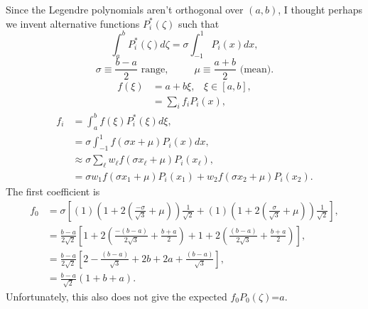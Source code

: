 \documentclass[11pt]{article} %
\begin{document}
Since the Legendre polynomials aren't orthogonal over $(a,b)$, I thought perhaps we invent alternative functions $P^*_i(\zeta)$ such that
\begin{equation}
\int_a^b P^*_i(\zeta) d\zeta = \sigma \int_{-1}^1 P_i(x)dx,
\end{equation}
\begin{equation}
\sigma \equiv \frac{b-a}{2} \text{ range}, \hspace{30pt} \mu\equiv \frac{a+b}{2} \text{ (mean)}.
\end{equation}
\begin{align}
f(\xi)&=a+b\xi,\hspace{10pt}\xi\in[a,b],\\
  &=\sum_i f_i P_i(x),
\end{align}
\begin{align}
f_i &= \int_a^b f(\xi)P_i^*(\xi) d\xi,\\
    &=\sigma\int_{-1}^1 f(\sigma x+\mu) P_i(x)dx,\\
    &\approx \sigma\sum_\ell w_\ell f(\sigma x_\ell+\mu)P_i(x_\ell),\\
    &=\sigma w_1 f(\sigma x_1+\mu)P_i(x_1) + w_2 f(\sigma x_2+\mu)P_i(x_2).
\end{align}
The first coefficient is
\begin{align}
f_0 &= \sigma\left[(1)\left(1+2\left(\frac{-\sigma}{\sqrt{3}}+\mu\right)\right)\frac{1}{\sqrt{2}} + (1)\left(1+2\left(\frac{\sigma}{\sqrt{3}}+\mu\right)\right) \frac{1}{\sqrt{2}}\right],\\
  &= \frac{b-a}{2\sqrt{2}}\left[1+2\left(\frac{-(b-a)}{2\sqrt{3}}+\frac{b+a}{2}\right) + 1+2\left(\frac{(b-a)}{2\sqrt{3}}+\frac{b+a}{2}\right) \right],\\
  &=\frac{b-a}{2\sqrt{2}}\left[2-\frac{(b-a)}{\sqrt{3}}+2b+2a + \frac{(b-a)}{\sqrt{3}}  \right],\\
  &=\frac{b-a}{\sqrt{2}}(1+b+a).
\end{align}
Unfortunately, this also does not give the expected $f_0P_0(\zeta)$=$a$.
\end{document}
